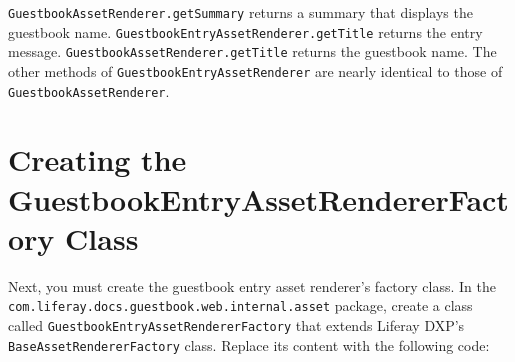 \texttt{GuestbookAssetRenderer.getSummary} returns a summary that
displays the guestbook name.
\texttt{GuestbookEntryAssetRenderer.getTitle} returns the entry message.
\texttt{GuestbookAssetRenderer.getTitle} returns the guestbook name. The
other methods of \texttt{GuestbookEntryAssetRenderer} are nearly
identical to those of \texttt{GuestbookAssetRenderer}.

\section{Creating the GuestbookEntryAssetRendererFactory
Class}\label{creating-the-guestbookentryassetrendererfactory-class}

Next, you must create the guestbook entry asset renderer's factory
class. In the \texttt{com.liferay.docs.guestbook.web.internal.asset}
package, create a class called
\texttt{GuestbookEntryAssetRendererFactory} that extends Liferay DXP's
\texttt{BaseAssetRendererFactory} class. Replace its content with the
following code:

